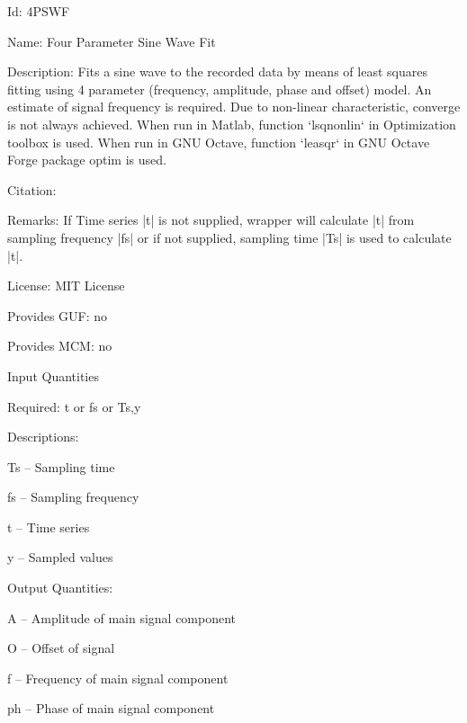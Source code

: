 \begin{tightdesc}
\item [Id:] 4PSWF
\item [Name:] Four Parameter Sine Wave Fit
\item [Description:] Fits a sine wave to the recorded data by means of least squares fitting using 4 parameter (frequency, amplitude, phase and offset) model. An estimate of signal frequency is required. Due to non-linear characteristic, converge is not always achieved. When run in Matlab, function `lsqnonlin` in Optimization toolbox is used. When run in GNU Octave, function `leasqr` in GNU Octave Forge package optim is used.
\item [Citation:] 
\item [Remarks:] If Time series |t| is not supplied, wrapper will calculate |t| from sampling frequency |fs| or if not supplied, sampling time |Ts| is used to calculate |t|.
\item [License:] MIT License
\item [Provides GUF:] no
\item [Provides MCM:] no
\item [Input Quantities] \rule{0em}{0em}
    \begin{tightdesc}
    \item [Required:] 
        \textsf{t} or \textsf{fs} or \textsf{Ts},\enspace \textsf{y}
    \item [Descriptions:] \rule{0em}{0em}
        \begin{tightdesc}
            \item[\textsf{Ts}] -- Sampling time
            \item[\textsf{fs}] -- Sampling frequency
            \item[\textsf{t}] -- Time series
            \item[\textsf{y}] -- Sampled values
        \end{tightdesc}
    \end{tightdesc}
\item [Output Quantities:] \rule{0em}{0em}
    \begin{tightdesc}
        \item[\textsf{A}] -- Amplitude of main signal component
        \item[\textsf{O}] -- Offset of signal
        \item[\textsf{f}] -- Frequency of main signal component
        \item[\textsf{ph}] -- Phase of main signal component
    \end{tightdesc}
\end{tightdesc}
